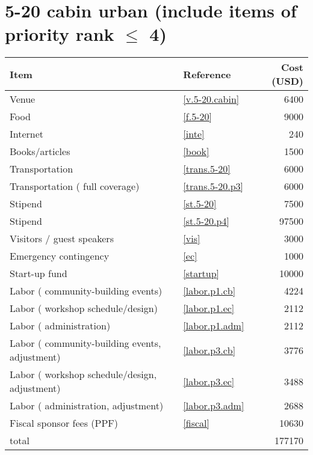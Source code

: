 \section*{5-20 cabin urban (include items of priority rank $\leq$ 4)}
\begin{center}
\begin{tabular}{llr}
Item & Reference & Cost (USD) \\ \hline
Venue & \ref{v.5-20.cabin} & 6400 \\
Food & \ref{f.5-20} & 9000 \\
Internet & \ref{inte} & 240 \\
Books/articles & \ref{book} & 1500 \\
Transportation & \ref{trans.5-20} & 6000 \\
Transportation ( full coverage) & \ref{trans.5-20.p3} & 6000 \\
Stipend & \ref{st.5-20} & 7500 \\
Stipend & \ref{st.5-20.p4} & 97500 \\
Visitors / guest speakers & \ref{vis} & 3000 \\
Emergency contingency & \ref{ec} & 1000 \\
Start-up fund & \ref{startup} & 10000 \\
Labor ( community-building events) & \ref{labor.p1.cb} & 4224 \\
Labor ( workshop schedule/design) & \ref{labor.p1.ec} & 2112 \\
Labor ( administration) & \ref{labor.p1.adm} & 2112 \\
Labor ( community-building events, adjustment) & \ref{labor.p3.cb} & 3776 \\
Labor ( workshop schedule/design, adjustment) & \ref{labor.p3.ec} & 3488 \\
Labor ( administration, adjustment) & \ref{labor.p3.adm} & 2688 \\
Fiscal sponsor fees (PPF) & \ref{fiscal} & 10630 \\ \hline
total &  & 177170
\end{tabular}
\end{center}
\newpage
